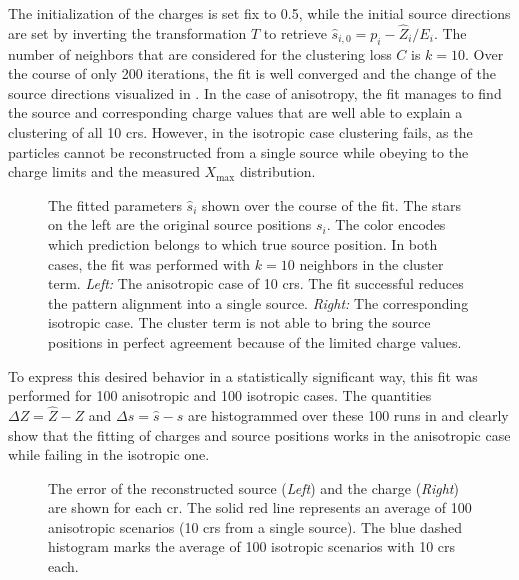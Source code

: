 The initialization of the charges is set fix to 0.5, while the initial source directions are set by inverting the transformation \(T\) to retrieve \(\hat s_{i,0} = p_i - \hat Z_i / E_i\). The number of neighbors that are considered for the clustering loss \(C\) is \(k=10\). Over the course of only 200 iterations, the fit is well converged and the change of the source directions visualized in . In the case of anisotropy, the fit manages to find the source and corresponding charge values that are well able to explain a clustering of all 10 \glspl{cr}. However, in the isotropic case clustering fails, as the particles cannot be reconstructed from a single source while obeying to the charge limits and the measured \(X_{\max}\) distribution.
\begin{figure}[ht!]
    \centering
    \begin{minipage}{0.49\textwidth}
    \end{minipage}
    \begin{minipage}{0.49\textwidth}
    \end{minipage}
    \caption{The fitted parameters \(\hat s_i\) shown over the course of the fit. The stars on the left are the original source positions \(s_i\). The color encodes which prediction belongs to which true source position. In both cases, the fit was performed with \(k=10\) neighbors in the cluster term. \emph{Left:} The anisotropic case of 10 \glspl{cr}. The fit successful reduces the pattern alignment into a single source. \emph{Right:} The corresponding isotropic case. The cluster term is not able to bring the source positions in perfect agreement because of the limited charge values.}\label{fig:1d-history}
\end{figure}

To express this desired behavior in a statistically significant way, this fit was performed for 100 anisotropic and 100 isotropic cases. The quantities \(\Delta Z= \hat Z - Z\) and \(\Delta s = \hat s - s\) are histogrammed over these 100 runs in  and clearly show that the fitting of charges and source positions works in the anisotropic case while failing in the isotropic one.
\begin{figure}[ht!]
    \centering
    \begin{minipage}{0.49\textwidth}
    \end{minipage}
    \begin{minipage}{0.49\textwidth}
    \end{minipage}
    \caption{The error of the reconstructed source (\emph{Left}) and the charge (\emph{Right}) are shown for each \gls{cr}. The solid red line represents an average of 100 anisotropic scenarios (10 \glspl{cr} from a single source). The blue dashed histogram marks the average of 100 isotropic scenarios with 10 \glspl{cr} each.}\label{fig:1d-delta}
\end{figure}

